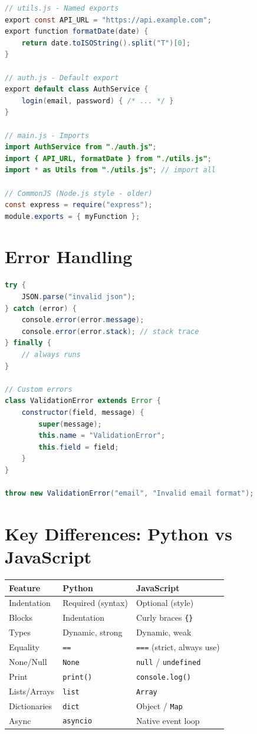 \documentclass[12pt, a4paper, oneside]{book}
\begin{document}
\begin{lstlisting}[language=Java, caption={ES6 module system}]
// utils.js - Named exports
export const API_URL = "https://api.example.com";
export function formatDate(date) {
    return date.toISOString().split("T")[0];
}

// auth.js - Default export
export default class AuthService {
    login(email, password) { /* ... */ }
}

// main.js - Imports
import AuthService from "./auth.js";
import { API_URL, formatDate } from "./utils.js";
import * as Utils from "./utils.js"; // import all

// CommonJS (Node.js style - older)
const express = require("express");
module.exports = { myFunction };
\end{lstlisting}

\section{Error Handling}

\begin{lstlisting}[language=Java, caption={Error handling in JS}]
try {
    JSON.parse("invalid json");
} catch (error) {
    console.error(error.message);
    console.error(error.stack); // stack trace
} finally {
    // always runs
}

// Custom errors
class ValidationError extends Error {
    constructor(field, message) {
        super(message);
        this.name = "ValidationError";
        this.field = field;
    }
}

throw new ValidationError("email", "Invalid email format");
\end{lstlisting}

\section{Key Differences: Python vs JavaScript}

\begin{center}
\begin{tabular}{l l l}
\toprule
\textbf{Feature} & \textbf{Python} & \textbf{JavaScript} \\
\midrule
Indentation & Required (syntax) & Optional (style) \\
Blocks & Indentation & Curly braces \texttt{\{\}} \\
Types & Dynamic, strong & Dynamic, weak \\
Equality & \texttt{==} & \texttt{===} (strict, always use) \\
None/Null & \texttt{None} & \texttt{null} / \texttt{undefined} \\
Print & \texttt{print()} & \texttt{console.log()} \\
Lists/Arrays & \texttt{list} & \texttt{Array} \\
Dictionaries & \texttt{dict} & Object / \texttt{Map} \\
Async & \texttt{asyncio} & Native event loop \\
\bottomrule
\end{tabular}
\end{center}
\end{document}

